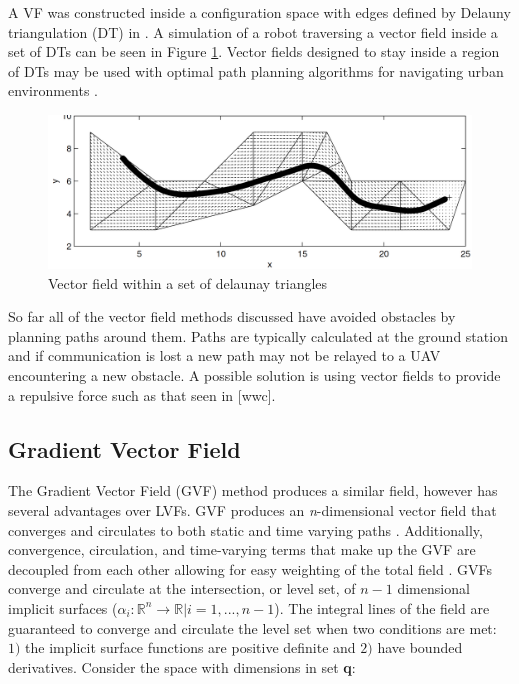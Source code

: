 \documentclass[numbered,pdftex]{ohio-etd}
\begin{document}
A VF was constructed inside a configuration space with edges defined by Delauny triangulation (DT) in \cite{pimenta_fully_2007}.  A simulation of a robot traversing a vector field inside a set of DTs can be seen in Figure \ref{fig:cdtVF}. Vector fields designed to stay inside a region of DTs may be used with optimal path planning algorithms for navigating urban environments \cite{md_simplex_2017}.


\begin{figure}
	\centering
	\includegraphics[width=15cm]{PaperFigures/cdtVF}
	\caption{Vector field within a set of delaunay triangles \cite{pimenta_fully_2007}}
	\label{fig:cdtVF}
\end{figure}

So far all of the vector field methods discussed have avoided obstacles by planning paths around them. Paths are typically calculated at the ground station and if communication is lost a new path may not be relayed to a UAV encountering a new obstacle. A possible solution is using vector fields to provide a repulsive force such as that seen in \cite{panagou_motion_2014,zhou_vector_2014} [wwc]. 

\subsection{Gradient Vector Field}
The Gradient Vector Field (GVF) method produces a similar field, however has several advantages over LVFs. GVF produces an \textit{n}-dimensional vector field that converges and circulates to both static and time varying paths \cite{goncalves_artificial_2009}. Additionally, convergence, circulation, and time-varying terms that make up the GVF are decoupled from each other allowing for easy weighting of the total field \cite{goncalves_circulation_2010}. GVFs converge and circulate at the intersection, or level set, of $n-1$ dimensional implicit surfaces ($\alpha_i:\mathbb{R}^n\rightarrow\mathbb{R} | i=1,...,n-1$). The integral lines of the field are guaranteed to converge and circulate the level set when two conditions are met: $1)$ the implicit surface functions are positive definite and $2)$ have bounded derivatives. Consider the space with dimensions in set \textbf{q}:
\end{document}
